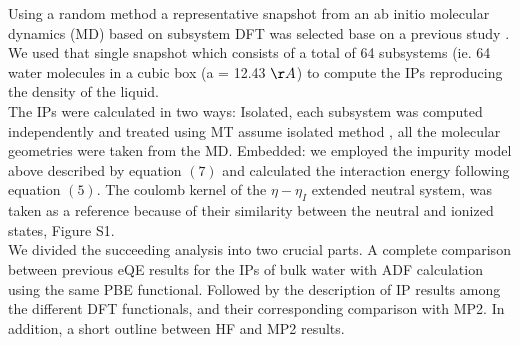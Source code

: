 \documentclass[12pt,a4paper]{article}
\begin{document}
Using a random method a representative snapshot from an ab initio molecular dynamics (MD) based on subsystem DFT was selected base on a
previous study \cite{genova2016avoiding}. We used that single snapshot which consists of a total of 64 subsystems
(ie. 64 water molecules in a cubic box (a = 12.43 $\AA$) to compute the IPs reproducing the density of the liquid. \\

The IPs were calculated in two ways: Isolated, each subsystem was computed independently and treated using MT
assume isolated method \cite{martyna1999reciprocal}, all the molecular geometries were taken from the MD. Embedded: 
we employed the impurity model above described by equation $(7)$ and calculated the interaction energy following 
equation $(5)$. The coulomb kernel of the $\eta -\eta_{I}$ extended neutral system, was taken as a reference because of
their similarity between the neutral and ionized states, Figure S1. \\

We divided the succeeding analysis into two crucial parts. A complete comparison between previous eQE results \cite{tolle2019charged} for the
IPs of bulk water with ADF calculation using the same PBE functional. Followed by the description of IP results among the different 
DFT functionals, and their corresponding comparison with MP2. In addition, a short outline between HF and MP2 results.\\
\end{document}
